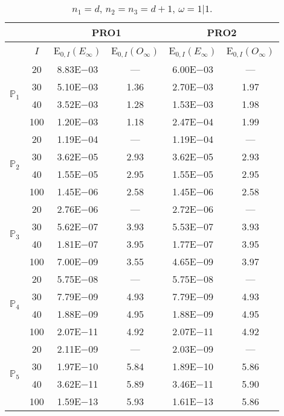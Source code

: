 \begin{table}[H]
\caption{$n_1=d$, $n_2=n_3=d+1$, $\omega=1|1$.}
\setlength{\tabcolsep}{5pt}
\centering
\begin{tabular}{@{}l c c c c c@{}}
\toprule
 &  & \multicolumn{2}{c}{PRO1} & \multicolumn{2}{c}{PRO2}\\
\midrule
 & $I$ & E$_{0,I}(E_{\infty})$ & E$_{0,I}(O_{\infty})$ & E$_{0,I}(E_{\infty})$ & E$_{0,I}(O_{\infty})$\\
\midrule
\multirow{4}{*}{$\mathbb{P}_{1}$}
 & 20 & 8.83E$-$03 & --- & 6.00E$-$03 & ---\\
 & 30 & 5.10E$-$03 & 1.36 & 2.70E$-$03 & 1.97 \\
 & 40 & 3.52E$-$03 & 1.28 & 1.53E$-$03 & 1.98 \\
 & 100 & 1.20E$-$03 & 1.18 & 2.47E$-$04 & 1.99 \\
\midrule
\multirow{4}{*}{$\mathbb{P}_{2}$}
 & 20 & 1.19E$-$04 & --- & 1.19E$-$04 & ---\\
 & 30 & 3.62E$-$05 & 2.93 & 3.62E$-$05 & 2.93 \\
 & 40 & 1.55E$-$05 & 2.95 & 1.55E$-$05 & 2.95 \\
 & 100 & 1.45E$-$06 & 2.58 & 1.45E$-$06 & 2.58 \\
\midrule
\multirow{4}{*}{$\mathbb{P}_{3}$}
 & 20 & 2.76E$-$06 & --- & 2.72E$-$06 & ---\\
 & 30 & 5.62E$-$07 & 3.93 & 5.53E$-$07 & 3.93 \\
 & 40 & 1.81E$-$07 & 3.95 & 1.77E$-$07 & 3.95 \\
 & 100 & 7.00E$-$09 & 3.55 & 4.65E$-$09 & 3.97 \\
\midrule
\multirow{4}{*}{$\mathbb{P}_{4}$}
 & 20 & 5.75E$-$08 & --- & 5.75E$-$08 & ---\\
 & 30 & 7.79E$-$09 & 4.93 & 7.79E$-$09 & 4.93 \\
 & 40 & 1.88E$-$09 & 4.95 & 1.88E$-$09 & 4.95 \\
 & 100 & 2.07E$-$11 & 4.92 & 2.07E$-$11 & 4.92 \\
\midrule
\multirow{4}{*}{$\mathbb{P}_{5}$}
 & 20 & 2.11E$-$09 & --- & 2.03E$-$09 & ---\\
 & 30 & 1.97E$-$10 & 5.84 & 1.89E$-$10 & 5.86 \\
 & 40 & 3.62E$-$11 & 5.89 & 3.46E$-$11 & 5.90 \\
 & 100 & 1.59E$-$13 & 5.93 & 1.61E$-$13 & 5.86 \\
\bottomrule
\end{tabular}
\label{Table:PRO:Rodrigo:Test3}
\end{table}
